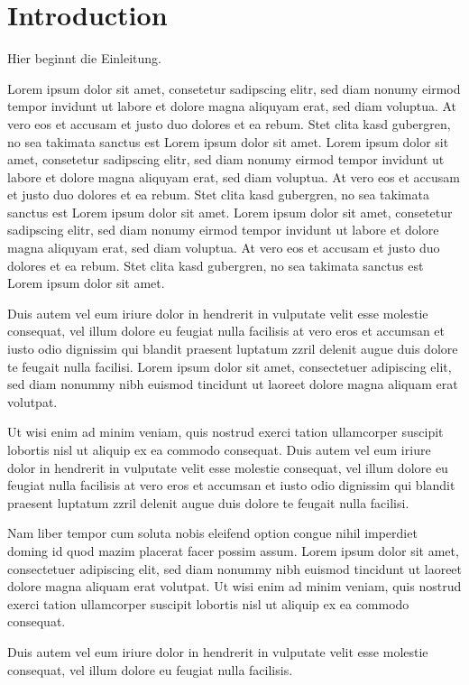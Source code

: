 \newpage
\section{Introduction}
Hier beginnt die Einleitung.

Lorem ipsum dolor sit amet, consetetur sadipscing elitr, sed diam nonumy eirmod tempor invidunt ut labore et dolore magna aliquyam erat, sed diam voluptua. At vero eos et accusam et justo duo dolores et ea rebum. Stet clita kasd gubergren, no sea takimata sanctus est Lorem ipsum dolor sit amet. Lorem ipsum dolor sit amet, consetetur sadipscing elitr, sed diam nonumy eirmod tempor invidunt ut labore et dolore magna aliquyam erat, sed diam voluptua. At vero eos et accusam et justo duo dolores et ea rebum. Stet clita kasd gubergren, no sea takimata sanctus est Lorem ipsum dolor sit amet. Lorem ipsum dolor sit amet, consetetur sadipscing elitr, sed diam nonumy eirmod tempor invidunt ut labore et dolore magna aliquyam erat, sed diam voluptua. At vero eos et accusam et justo duo dolores et ea rebum. Stet clita kasd gubergren, no sea takimata sanctus est Lorem ipsum dolor sit amet.

Duis autem vel eum iriure dolor in hendrerit in vulputate velit esse molestie consequat, vel illum dolore eu feugiat nulla facilisis at vero eros et accumsan et iusto odio dignissim qui blandit praesent luptatum zzril delenit augue duis dolore te feugait nulla facilisi. Lorem ipsum dolor sit amet, consectetuer adipiscing elit, sed diam nonummy nibh euismod tincidunt ut laoreet dolore magna aliquam erat volutpat.

Ut wisi enim ad minim veniam, quis nostrud exerci tation ullamcorper suscipit lobortis nisl ut aliquip ex ea commodo consequat. Duis autem vel eum iriure dolor in hendrerit in vulputate velit esse molestie consequat, vel illum dolore eu feugiat nulla facilisis at vero eros et accumsan et iusto odio dignissim qui blandit praesent luptatum zzril delenit augue duis dolore te feugait nulla facilisi.

Nam liber tempor cum soluta nobis eleifend option congue nihil imperdiet doming id quod mazim placerat facer possim assum. Lorem ipsum dolor sit amet, consectetuer adipiscing elit, sed diam nonummy nibh euismod tincidunt ut laoreet dolore magna aliquam erat volutpat. Ut wisi enim ad minim veniam, quis nostrud exerci tation ullamcorper suscipit lobortis nisl ut aliquip ex ea commodo consequat.

Duis autem vel eum iriure dolor in hendrerit in vulputate velit esse molestie consequat, vel illum dolore eu feugiat nulla facilisis.

